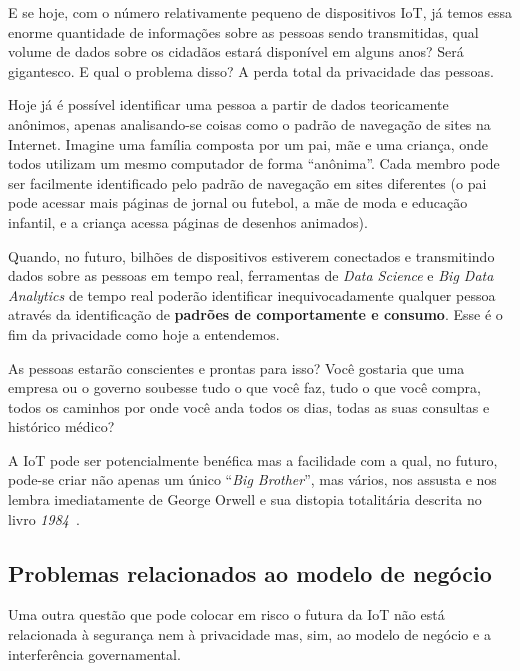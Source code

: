 \documentclass[pdftex, brazil, 12pt, twoside]{article}
\newcommand{\ingles}[1]{\textit{#1}}
\begin{document}
E se hoje, com o número relativamente pequeno de dispositivos IoT, já temos
essa enorme quantidade de informações sobre as pessoas sendo transmitidas,
qual volume de dados sobre os cidadãos estará disponível em alguns anos?
Será gigantesco. E qual o problema disso? A perda total da privacidade das pessoas.

Hoje já é possível identificar uma pessoa a partir de dados teoricamente anônimos,
apenas analisando-se coisas como o padrão de navegação de sites na Internet.
Imagine uma família composta por um pai, mãe e uma criança, onde todos utilizam
um mesmo computador de forma ``anônima''. Cada membro pode ser facilmente identificado
pelo padrão de navegação em sites diferentes (o pai pode acessar mais páginas
de jornal ou futebol, a mãe de moda e educação infantil,
e a criança acessa páginas de desenhos animados).

Quando, no futuro, bilhões de dispositivos estiverem conectados e transmitindo
dados sobre as pessoas em tempo real, ferramentas de \ingles{Data Science} e
\ingles{Big Data Analytics} de tempo real poderão identificar inequivocadamente
qualquer pessoa através da identificação de \textbf{padrões de comportamente e consumo}.
Esse é o fim da privacidade como hoje a entendemos.

As pessoas estarão conscientes e prontas para isso? Você gostaria que uma
empresa ou o governo soubesse tudo o que você faz, tudo o que você compra,
todos os caminhos por onde você anda todos os dias, todas as suas consultas
e histórico médico?

A IoT pode ser potencialmente benéfica mas a facilidade com a qual, no futuro,
pode-se criar não apenas um único ``\ingles{Big Brother}'', mas vários,
nos assusta e nos lembra imediatamente de George Orwell e sua distopia
totalitária descrita no livro \emph{1984}~\citep{Orwell1984}.


\subsection{Problemas relacionados ao modelo de negócio}
\label{perigos-iot-modelo-negocio}

Uma outra questão que pode colocar em risco o futura da IoT não está relacionada
à segurança nem à privacidade mas, sim, ao modelo de negócio e a interferência governamental.
\end{document}

